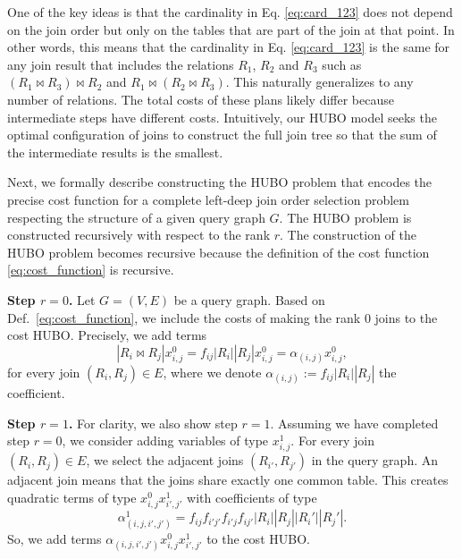 \begin{example}
One of the key ideas is that the cardinality in Eq. \eqref{eq:card_123} does not depend on the join order but only on the tables that are part of the join at that point. In other words, this means that the cardinality in Eq. \eqref{eq:card_123} is the same for any join result that includes the relations $R_1$, $R_2$ and $R_3$ such as $(R_1 \bowtie R_3) \bowtie R_2$ and $R_1 \bowtie (R_2 \bowtie R_3)$. This naturally generalizes to any number of relations. The total costs of these plans likely differ because intermediate steps have different costs. Intuitively, our HUBO model seeks the optimal configuration of joins to construct the full join tree so that the sum of the intermediate results is the smallest.
\end{example}

Next, we formally describe constructing the HUBO problem that encodes the precise cost function for a complete left-deep join order selection problem respecting the structure of a given query graph $G$. The HUBO problem is constructed recursively with respect to the rank $r$. The construction of the HUBO problem becomes recursive because the definition of the cost function \eqref{eq:cost_function} is recursive.

\textbf{Step $r = 0$.} Let $G = (V, E)$ be a query graph. Based on Def.~\eqref{eq:cost_function}, we include the costs of making the rank $0$ joins to the cost HUBO. Precisely, we add terms
\begin{equation*}
    |R_i \bowtie R_j|x_{i,j}^{0} = f_{ij}|R_i||R_j|x_{i,j}^{0} = \alpha_{(i,j)}x_{i,j}^{0},
\end{equation*}
for every join $(R_i, R_j) \in E$, where we denote $\alpha_{(i,j)} := f_{ij}|R_i||R_j|$ the coefficient.

\textbf{Step $r = 1$.} For clarity, we also show step $r = 1$. Assuming we have completed step $r = 0$, we consider adding variables of type $x_{i,j}^{1}$. For every join $(R_i, R_j) \in E$, we select the adjacent joins $(R_{i'}, R_{j'})$ in the query graph. An adjacent join means that the joins share exactly one common table. This creates quadratic terms of type $x_{i,j}^{0}x_{i',j'}^{1}$ with coefficients of type $$\alpha^{1}_{(i,j,i',j')} = f_{ij}f_{i'j'}f_{i'j}f_{ij'}|R_i||R_j||R_i'||R_j'|.$$ So, we add terms $\alpha_{(i,j,i',j')}x_{i,j}^{0}x_{i',j'}^{1}$ to the cost HUBO.

